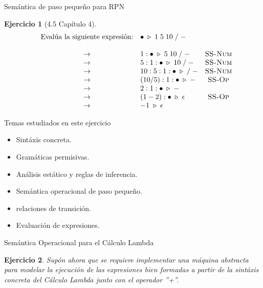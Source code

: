 \documentclass[11pt]{beamer}
\newtheorem{exercise}{Ejercicio}
\begin{document}
\begin{frame}{Semántica de paso pequeño para RPN}
	\begin{exercise}[4.5 Capítulo 4]
	\small
	
	\[
		\begin{array}{lclc}
			&  \text{Evalúa la siguiente expresión:}              &\bullet \;\triangleright\; 1\;5\;10\;/\;- \\ \\
			&\rightarrow& 1 : \bullet \;\triangleright\; 5\;10\;/\;- &\textsc{SS-Num} \\
			
			&\rightarrow& 5 : 1 : \bullet \;\triangleright\; 10\;/\;- & \textsc{SS-Num} \\
			
			&\rightarrow& 10 : 5 : 1 : \bullet \;\triangleright\; /\;- & \textsc{SS-Num} \\
			
			&\rightarrow& (10 / 5) : 1 : \bullet \;\triangleright\; - & \textsc{SS-Op} \\
			
			&\rightarrow& 2 : 1 : \bullet \;\triangleright\; - & \\
			
			&\rightarrow& (1 - 2) : \bullet \;\triangleright\; \epsilon & \textsc{SS-Op} \\
			
			&\rightarrow& -1 \;\triangleright\; \epsilon &
		\end{array}
	\]
	\end{exercise}
	
\end{frame}


\begin{frame}{Temas estudiados en este ejercicio}
	\begin{itemize}
		\item Sintáxis concreta.
		\item Gramáticas permisivas.
		\item Análisis estático y reglas de inferencia.
		\item Semántica operacional de paso pequeño.
		\item relaciones de transición.
		\item Evaluación de expresiones.
	\end{itemize}
\end{frame}

\begin{frame}{Semántica Operacional para el Cálculo Lambda}
	\begin{exercise}
		Supón ahora que se requiere implementar una máquina abstracta para modelar la ejecución de las expresiones bien formadas a partir de la sintáxis concreta del Cálculo Lambda junto con el operador ''+''. \\[1em]
	\end{exercise}
\end{frame}
\end{document}

